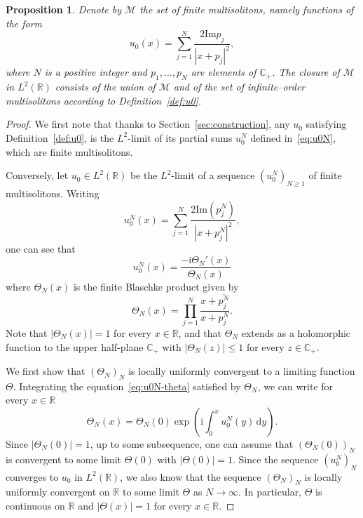 \documentclass[english, 12pt]{amsart}%
\newcommand{\R}{\mathbb{R}}
\newcommand{\C}{\mathbb{C}}
\newcommand{\ii}{\mathrm{i}}
\newcommand{\dd}{\,\mathrm{d}}
\renewcommand{\Im}{\mathrm{Im}}
\newtheorem{proposition}[definition]{Proposition}
\numberwithin{equation}{section}
\begin{document}
\begin{proposition}
Denote by $\mathscr M$ the set of finite multisolitons, namely functions of the form
\[ u_0(x)=\sum_{j=1}^N \frac{2\Im{p_j}}{|x+p_j|^2},\]
where $N$ is a positive integer and $p_1,\dots,p_N$ are elements of $\C_+$. The closure of $\mathscr M$ in $L^2(\R)$ consists of the union of $\mathscr M$ and of the set of  infinite--order multisolitons according to Definition~\ref{def:u0}.
\end{proposition}
\begin{proof}
We first note that thanks to Section~\ref{sec:construction}, any $u_0$ satisfying Definition~\ref{def:u0}, is the $L^2$-limit of its partial sums $u_0^N$ defined in~\eqref{eq:u0N}, which are finite multisolitons.

Conversely, let $u_0\in L^2(\R)$ be the $L^2$-limit of a sequence $(u_0^N)_{N\geq 1}$ of finite multisolitons. Writing
\[
u_0^N(x)=\sum_{j=1}^N \frac{2\Im(p_j^N)}{|x+p_j^N|^2},
\]
one can see that
\begin{equation}\label{eq:u0N-theta}
u_0^N(x)=\frac{-\ii \Theta_N'(x)}{\Theta_N(x)}
\end{equation}
where $\Theta_N(x)$ is the finite Blaschke product given by
\[
\Theta_N(x)=\prod_{j=1}^N\frac{x+\overline{p_j^N}}{x+p_j^N}.
\]
Note that $|\Theta_N(x)|=1$ for every $x\in\R$, and that $\Theta_N$ extends as a holomorphic function to the upper half-plane  $\C_+$ with $|\Theta_N(z)|\leq 1$ for every $z\in\C_+$.

We first show that $(\Theta_N)_N$ is locally uniformly convergent to a limiting function $\Theta$.
Integrating the equation~\eqref{eq:u0N-theta} satisfied by $\Theta_N$, we can write for every $x\in\R$
\[
\Theta_N(x)=\Theta_N(0)\exp\left(\ii\int_0^x u_0^N(y)\dd y\right).
\]
Since $|\Theta_N(0)|=1$, up to some subsequence, one can assume that $(\Theta_N(0))_N$ is convergent to some limit $\Theta(0)$ with $|\Theta(0)|=1$.
Since the sequence $(u_0^N)_N$ converges to $u_0$ in $L^2(\R)$, we also know that  the sequence $(\Theta_N)_N$ is locally uniformly convergent on $\R$ to some limit $\Theta$ as $N\to\infty$. In particular, $\Theta$ is continuous on $\R$ and $|\Theta(x)|=1$ for every $x\in\R$.


\end{proof}
\end{document}
